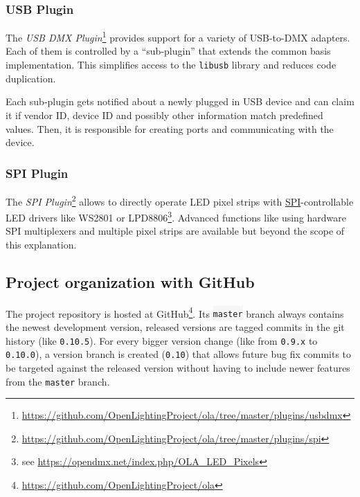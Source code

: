 \hypertarget{sec:ola-usb-plugin}{\subsubsection{USB
Plugin}\label{sec:ola-usb-plugin}}

The \emph{USB DMX Plugin}\footnote{\url{https://github.com/OpenLightingProject/ola/tree/master/plugins/usbdmx}}
provides support for a variety of USB-to-DMX adapters. Each of them is
controlled by a ``sub-plugin'' that extends the common basis
implementation. This simplifies access to the \colorbox{WhiteSmoke}{\lstinline!libusb!} library
and reduces code duplication.

Each sub-plugin gets notified about a newly plugged in USB device and
can claim it if vendor ID, device ID and possibly other information
match predefined values. Then, it is responsible for creating ports and
communicating with the device.

\subsubsection{SPI Plugin}\label{sec:ola-spi-plugin}

The \emph{SPI Plugin}\footnote{\url{https://github.com/OpenLightingProject/ola/tree/master/plugins/spi}}
allows to directly operate LED pixel strips with
\protect\hyperlink{sec:spi}{SPI}-controllable LED drivers like WS2801 or
LPD8806\footnote{see \url{https://opendmx.net/index.php/OLA_LED_Pixels}}.
Advanced functions like using hardware SPI multiplexers and multiple
pixel strips are available but beyond the scope of this explanation.

\subsection{Project organization with
GitHub}\label{project-organization-with-github}

The project repository is hosted at GitHub\footnote{\url{https://github.com/OpenLightingProject/ola}}.
Its \colorbox{WhiteSmoke}{\lstinline!master!} branch always contains the newest development
version, released versions are tagged commits in the git history (like
\colorbox{WhiteSmoke}{\lstinline!0.10.5!}). For every bigger version change (like from
\colorbox{WhiteSmoke}{\lstinline!0.9.x!} to \colorbox{WhiteSmoke}{\lstinline!0.10.0!}), a version branch is created
(\colorbox{WhiteSmoke}{\lstinline!0.10!}) that allows future bug fix commits to be targeted
against the released version without having to include newer features
from the \colorbox{WhiteSmoke}{\lstinline!master!} branch.

